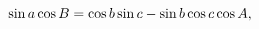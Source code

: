 \[\mathop{\sin\/}\nolimits a\mathop{\cos\/}\nolimits B=\mathop{\cos\/}\nolimits b%
\mathop{\sin\/}\nolimits c-\mathop{\sin\/}\nolimits b\mathop{\cos\/}\nolimits c%
\mathop{\cos\/}\nolimits A,\]